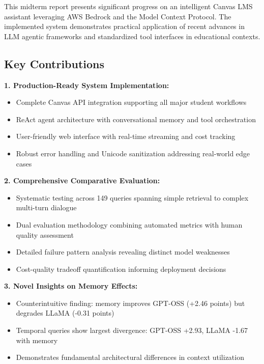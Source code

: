 \documentclass{article}
\begin{document}
This midterm report presents significant progress on an intelligent Canvas LMS assistant leveraging AWS Bedrock and the Model Context Protocol. The implemented system demonstrates practical application of recent advances in LLM agentic frameworks \cite{wang2025megaagent, chen2024llmma} and standardized tool interfaces \cite{mcp2025landscape} in educational contexts.

\subsection{Key Contributions}

\textbf{1. Production-Ready System Implementation:}
\begin{itemize}
    \item Complete Canvas API integration supporting all major student workflows
    \item ReAct agent architecture with conversational memory and tool orchestration
    \item User-friendly web interface with real-time streaming and cost tracking
    \item Robust error handling and Unicode sanitization addressing real-world edge cases
\end{itemize}

\textbf{2. Comprehensive Comparative Evaluation:}
\begin{itemize}
    \item Systematic testing across 149 queries spanning simple retrieval to complex multi-turn dialogue
    \item Dual evaluation methodology combining automated metrics with human quality assessment
    \item Detailed failure pattern analysis revealing distinct model weaknesses
    \item Cost-quality tradeoff quantification informing deployment decisions
\end{itemize}

\textbf{3. Novel Insights on Memory Effects:}
\begin{itemize}
    \item Counterintuitive finding: memory improves GPT-OSS (+2.46 points) but degrades LLaMA (-0.31 points)
    \item Temporal queries show largest divergence: GPT-OSS +2.93, LLaMA -1.67 with memory
    \item Demonstrates fundamental architectural differences in context utilization
\end{itemize}
\end{document}
